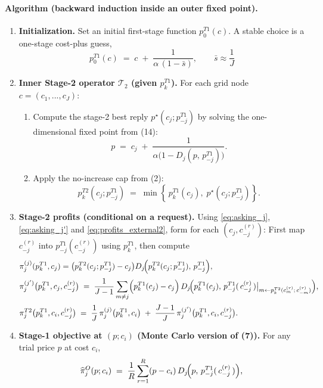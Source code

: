 \documentclass[12pt]{article}
\begin{document}
\paragraph{Algorithm (backward induction inside an outer fixed point).}
\begin{enumerate}
  \item \textbf{Initialization.} Set an initial first-stage function $p^{T1}_0(c)$.
  A stable choice is a one-stage cost-plus guess,
  \[
    p^{T1}_0(c) \;=\; c \;+\; \frac{1}{\alpha\,(1-\bar s)},\qquad \bar s \approx \frac{1}{J}
  \]
  
  \item \textbf{Inner Stage-2 operator $\mathcal{T}_2$ (given $p^{T1}_k$).}
  For each grid node $c = (c_1, ..., c_J)$:
  \begin{enumerate}
    \item Compute the stage-2 best reply $p^\star(c_j; p^{T1}_{-j})$ by solving
    the one-dimensional fixed point from (14):
    \[
      p \;=\; c_j \;+\; \frac{1}{\alpha\bigl(1 - D_j(p,\,p^{T1}_{-j})\bigr)}.
    \]
    \item Apply the no-increase cap from (2):
    \[
      p^{T2}_k (c_j; p^{T1}_{-j})
      \;=\; \min\!\left\{\,p^{T1}_k(c_j),\; p^\star(c_j; p^{T1}_{-j}) \right\}.
    \]
  \end{enumerate}

  \item \textbf{Stage-2 profits (conditional on a request).}
  Using \ref{eq:asking_j}, \ref{eq:asking_j'} and \ref{eq:profits_external2}, form for each $(c_j, c^{(r)}_{-j})$:
  First map $c^{(r)}_{-j}$ into $p^{T1}_{-j}(c^{(r)}_{-j})$ using $p^{T1}_k$,
  then compute
  \[
  \begin{aligned}
   &\pi^{(j)}_j(p^{T1}_k, c_j) =
   \bigl( p^{T2}_k (c_j; p^{T1}_{-j}) 
    -c_j\bigr)    D_j\!\Bigl(    p^{T2}_k (c_j; p^{T1}_{-j})  ,\,p^{T1}_{-j}\Bigr) ,\\[2pt]
   &\pi^{(j')}_j\bigl(p^{T1}_k, c_j, c^{(r)}_{-j}\bigr)
   \;=\; \frac{1}{J-1}\sum_{m\neq j}
   \Bigl(p^{T1}_k(c_j)-c_j\Bigr)\,
   D_j\!\Bigl(p^{T1}_k(c_j),\,
   p^{T1}_{-j}(\,c^{(r)}_{-j}\,)\big|_{m \leftarrow p^{T2}_k(c^{(r)}_{m};\,c^{(r)}_{-m})}\Bigr),\\[2pt]
   &\pi^{T2}_j\bigl(p^{T1}_k, c_i, c^{(r)}_{-j}\bigr)
   \;=\; \frac{1}{J}\,\pi^{(j)}_j\bigl(p^{T1}_k, c_i\bigr)
   \;+\; \frac{J-1}{J}\,\pi^{(j')}_j\bigl(p^{T1}_k, c_i, c^{(r)}_{-j}\bigr).
  \end{aligned}
  \]

  \item \textbf{Stage-1 objective at $(p;c_i)$ (Monte Carlo version of (7)).}
  For any trial price $p$ at cost $c_i$,
  \[
  \widehat{\pi}^{O}_j(p;c_i)
  \;=\;
  \frac{1}{R}\sum_{r=1}^R (p-c_i)\,
  D_j\!\Bigl(p,\,p^{T1}_{-j}(\,c^{(r)}_{-j}\,)\Bigr),
  \]


\end{enumerate}
\end{document}
